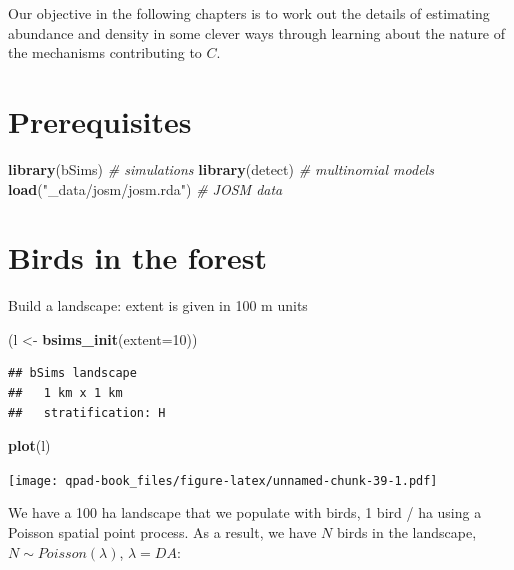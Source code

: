 \documentclass[12pt,]{book}
\newenvironment{Shaded}{\begin{snugshade}}{\end{snugshade}}
\newcommand{\CommentTok}[1]{\textcolor[rgb]{0.56,0.35,0.01}{\textit{#1}}}
\newcommand{\DataTypeTok}[1]{\textcolor[rgb]{0.13,0.29,0.53}{#1}}
\newcommand{\DecValTok}[1]{\textcolor[rgb]{0.00,0.00,0.81}{#1}}
\newcommand{\KeywordTok}[1]{\textcolor[rgb]{0.13,0.29,0.53}{\textbf{#1}}}
\newcommand{\NormalTok}[1]{#1}
\newcommand{\StringTok}[1]{\textcolor[rgb]{0.31,0.60,0.02}{#1}}
\begin{document}
Our objective in the following chapters is to work out the details of
estimating abundance and density in some clever ways through
learning about the nature of the mechanisms contributing to \(C\).

\hypertarget{prerequisites-2}{%
\section{Prerequisites}\label{prerequisites-2}}

\begin{Shaded}
\begin{Highlighting}[]
\KeywordTok{library}\NormalTok{(bSims)                }\CommentTok{# simulations}
\KeywordTok{library}\NormalTok{(detect)               }\CommentTok{# multinomial models}
\KeywordTok{load}\NormalTok{(}\StringTok{"_data/josm/josm.rda"}\NormalTok{)   }\CommentTok{# JOSM data}
\end{Highlighting}
\end{Shaded}

\hypertarget{birds-in-the-forest}{%
\section{Birds in the forest}\label{birds-in-the-forest}}

Build a landscape: extent is given in 100 m units

\begin{Shaded}
\begin{Highlighting}[]
\NormalTok{(l <-}\StringTok{ }\KeywordTok{bsims_init}\NormalTok{(}\DataTypeTok{extent=}\DecValTok{10}\NormalTok{))}
\end{Highlighting}
\end{Shaded}

\begin{verbatim}
## bSims landscape
##   1 km x 1 km
##   stratification: H
\end{verbatim}

\begin{Shaded}
\begin{Highlighting}[]
\KeywordTok{plot}\NormalTok{(l)}
\end{Highlighting}
\end{Shaded}

\texttt{[image: qpad-book\_files/figure-latex/unnamed-chunk-39-1.pdf]}

We have a 100 ha landscape that we populate with birds,
1 bird / ha using a Poisson spatial point process.
As a result, we have \(N\) birds in the landscape,
\(N \sim Poisson(\lambda)\), \(\lambda = DA\):
\end{document}
